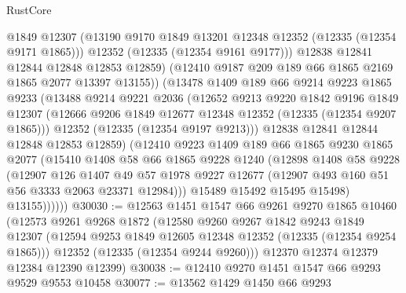\begin{lexlean}{RustCore}
\begin{coremodule}
                  @1849
                  @12307
                  (@13190 @9170 @1849 @13201 @12348 @12352 (@12335 (@12354 @9171 @1865)))
                  @12352
                  (@12335 (@12354 @9161 @9177)))
                @12838
                @12841
                @12844
                @12848
                @12853
                @12859)
              (@12410 @9187 @209 @189 @66 @1865 @2169 @1865 @2077 @13397 @13155))
            (@13478
              @1409
              @189
              @66
              @9214
              @9223
              @1865
              @9233
              (@13488
                @9214
                @9221
                @2036
                (@12652
                  @9213
                  @9220
                  @1842
                  @9196
                  @1849
                  @12307
                  (@12666 @9206 @1849 @12677 @12348 @12352 (@12335 (@12354 @9207 @1865)))
                  @12352
                  (@12335 (@12354 @9197 @9213)))
                @12838
                @12841
                @12844
                @12848
                @12853
                @12859)
              (@12410
                @9223
                @1409
                @189
                @66
                @1865
                @9230
                @1865
                @2077
                (@15410
                  @1408
                  @58
                  @66
                  @1865
                  @9228
                  @1240
                  (@12898
                    @1408
                    @58
                    @9228
                    (@12907
                      @126
                      @1407
                      @49
                      @57
                      @1978
                      @9227
                      @12677
                      (@12907 @493 @160 @51 @56 @3333 @2063 @23371 @12984)))
                  @15489
                  @15492
                  @15495
                  @15498)
                @13155))))))
@30030 := @12563
    @1451
    @1547
    @66
    @9261
    @9270
    @1865
    @10460
    (@12573
      @9261
      @9268
      @1872
      (@12580
        @9260
        @9267
        @1842
        @9243
        @1849
        @12307
        (@12594 @9253 @1849 @12605 @12348 @12352 (@12335 (@12354 @9254 @1865)))
        @12352
        (@12335 (@12354 @9244 @9260)))
      @12370
      @12374
      @12379
      @12384
      @12390
      @12399)
@30038 := @12410 @9270 @1451 @1547 @66 @9293 @9529 @9553 @10458
@30077 := @13562
    @1429
    @1450
    @66
    @9293

\end{coremodule}
\end{lexlean}
